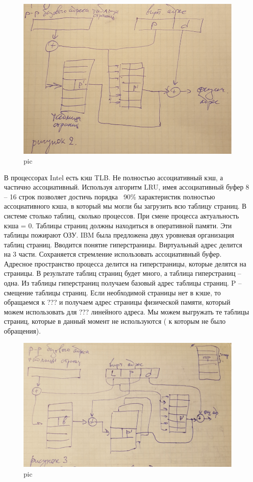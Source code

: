 \begin{figure}[H]
    \centering
    \includegraphics[width=\textwidth]{pic/2.png}
    \caption{pic}
\end{figure}

В процессорах Intel есть кэш TLB. Не полностью ассоциативный кэш, а частично ассоциативный. Используя алгоритм LRU, имея ассоциативный буфер 8 – 16 строк позволяет достичь порядка ~90\% характеристик полностью ассоциативного кэша, в который мы могли бы загрузить всю таблицу страниц.
В системе столько таблиц, сколько процессов. При смене процесса актуальность кэша = 0. Таблицы страниц должны находиться в оперативной памяти. Эти таблицы пожирают ОЗУ. IBM была предложена двух уровневая организация таблиц страниц. Вводится понятие гиперстраницы. Виртуальный адрес делится на 3 части. Сохраняется стремление использовать ассоциативный буфер. Адресное пространство процесса делится на гиперстраницы, которые делятся на страницы. В результате таблиц страниц будет много, а таблица гиперстраниц – одна. Из таблицы гиперстраниц получаем базовый адрес таблицы страниц. P – смещение таблицы страниц. Если необходимой страницы нет в кэше, то обращаемся к ??? и получаем адрес страницы физической памяти, который можем использовать для ??? линейного адреса. Мы можем выгружать те таблицы страниц, которые в данный момент не используются ( к которым не было обращения).

\begin{figure}[H]
    \centering
    \includegraphics[width=\textwidth]{pic/3.png}
    \caption{pic}
\end{figure}

